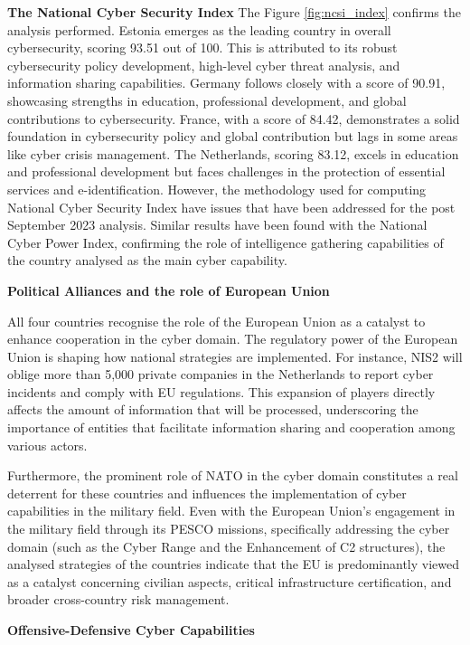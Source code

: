 \newpage
\textbf{The National Cyber Security Index}
The Figure \ref{fig:ncsi_index} confirms the analysis performed. Estonia emerges as the leading country in overall cybersecurity, scoring 93.51 out of 100. This is attributed to its robust cybersecurity policy development, high-level cyber threat analysis, and information sharing capabilities. Germany follows closely with a score of 90.91, showcasing strengths in education, professional development, and global contributions to cybersecurity. France, with a score of 84.42, demonstrates a solid foundation in cybersecurity policy and global contribution but lags in some areas like cyber crisis management. The Netherlands, scoring 83.12, excels in education and professional development but faces challenges in the protection of essential services and e-identification. However, the methodology used for computing National Cyber Security Index have issues that have been addressed for the post September 2023 analysis. Similar results have been found with the National Cyber Power Index, confirming the role of intelligence gathering capabilities of the country analysed as the main cyber capability. 

\textbf{Political Alliances and the role of European Union}

All four countries recognise the role of the European Union as a catalyst to enhance cooperation in the cyber domain. The regulatory power of the European Union is shaping how national strategies are implemented. For instance, NIS2 will oblige more than 5,000 private companies in the Netherlands to report cyber incidents and comply with EU regulations. This expansion of players directly affects the amount of information that will be processed, underscoring the importance of entities that facilitate information sharing and cooperation among various actors.

Furthermore, the prominent role of NATO in the cyber domain constitutes a real deterrent for these countries and influences the implementation of cyber capabilities in the military field. Even with the European Union's engagement in the military field through its PESCO missions, specifically addressing the cyber domain (such as the Cyber Range and the Enhancement of C2 structures), the analysed strategies of the countries indicate that the EU is predominantly viewed as a catalyst concerning civilian aspects, critical infrastructure certification, and broader cross-country risk management.

\textbf{Offensive-Defensive Cyber Capabilities}

